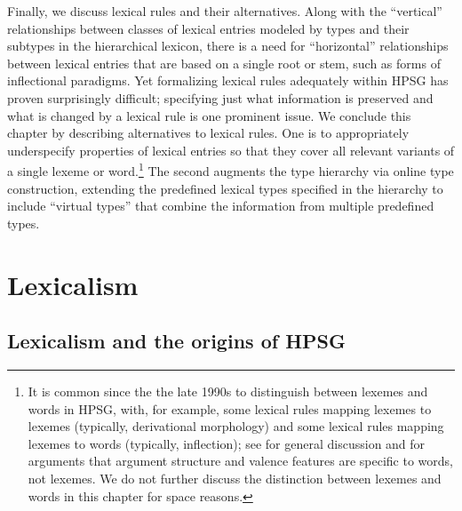 \documentclass[output=paper
 	        ,biblatex
                ,babelshorthands
                ,newtxmath
                ,draftmode
                ,colorlinks, citecolor=brown
]{langscibook}
\begin{document}
Finally, we discuss lexical rules and their alternatives.  Along with the ``vertical'' relationships
between classes of lexical entries modeled by types and their subtypes in the hierarchical lexicon,
there is a need for ``horizontal'' relationships between lexical entries that are based on a single
root or stem, such as forms of inflectional paradigms.  Yet formalizing lexical rules adequately
within HPSG has proven surprisingly difficult; specifying just what information is preserved and
what is changed by a lexical rule is one prominent issue.  We conclude this chapter by describing
alternatives to lexical rules.  One is to appropriately underspecify properties of lexical entries
so that they cover all relevant variants of a single lexeme or word.\footnote{It is common since the the late 1990s to distinguish between lexemes and words in HPSG, with, for example, some lexical rules mapping lexemes to lexemes (typically, derivational morphology) and some lexical rules mapping lexemes to words (typically, inflection); see \citet[176--178]{BonamiandCrysmann2018} for general discussion and \citet{RunnerandAranovich2003} for arguments that argument structure and valence features are specific to words, not lexemes. We do not further discuss the distinction between lexemes and words in this chapter for space reasons.} %
The second augments the type
hierarchy via online type construction, extending the predefined lexical types specified in the
hierarchy to include ``virtual types'' that combine the information from multiple predefined types.



\section{Lexicalism}
\label{sec:lex}
\subsection{Lexicalism and the origins of HPSG}
\end{document}
